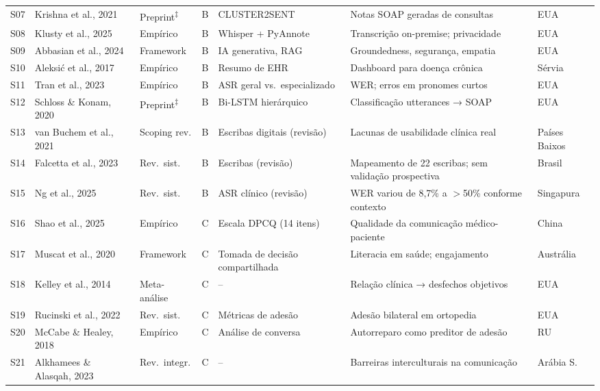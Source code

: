 \documentclass[a4paper,fleqn]{cas-sc}
\begin{document}
\begin{longtable}{p{0.65cm} p{2.4cm} p{1.55cm} p{0.55cm} p{2.2cm} p{2.35cm} p{1.4cm}}
S07 & Krishna et al., 2021   & Preprint\textsuperscript{‡} & B & CLUSTER2SENT    & Notas SOAP geradas de consultas        & EUA           \\
S08 & Klusty et al., 2025    & Empírico     & B & Whisper + PyAnnote         & Transcrição on-premise; privacidade    & EUA           \\
S09 & Abbasian et al., 2024  & Framework    & B & IA generativa, RAG         & Groundedness, segurança, empatia       & EUA           \\
S10 & Aleksić et al., 2017  & Empírico & B & Resumo de EHR & Dashboard para doença crônica & Sérvia  \\
S11 & Tran et al., 2023      & Empírico     & B & ASR geral vs.\ especializado & WER; erros em pronomes curtos        & EUA           \\
S12 & Schloss \& Konam, 2020 & Preprint\textsuperscript{‡} & B & Bi-LSTM hierárquico & Classificação utterances → SOAP  & EUA           \\
S13 & van Buchem et al., 2021 & Scoping rev. & B & Escribas digitais (revisão) & Lacunas de usabilidade clínica real  & Países Baixos \\
S14 & Falcetta et al., 2023  & Rev.\ sist.  & B & Escribas (revisão)         & Mapeamento de 22 escribas; sem validação prospectiva & Brasil \\
S15 & Ng et al., 2025        & Rev.\ sist.  & B & ASR clínico (revisão)      & WER variou de 8,7\% a $>$50\% conforme contexto & Singapura \\
S16 & Shao et al., 2025      & Empírico     & C & Escala DPCQ (14 itens)     & Qualidade da comunicação médico-paciente & China       \\
S17 & Muscat et al., 2020    & Framework    & C & Tomada de decisão compartilhada & Literacia em saúde; engajamento & Austrália  \\
S18 & Kelley et al., 2014    & Meta-análise & C & --                         & Relação clínica → desfechos objetivos  & EUA           \\
S19 & Rucinski et al., 2022  & Rev.\ sist.  & C & Métricas de adesão         & Adesão bilateral em ortopedia          & EUA           \\
S20 & McCabe \& Healey, 2018 & Empírico     & C & Análise de conversa        & Autorreparo como preditor de adesão    & RU            \\
S21 & Alkhamees \& Alasqah, 2023 & Rev.\ integr. & C & --               & Barreiras interculturais na comunicação & Arábia S.   \\

\end{longtable}
\end{document}
